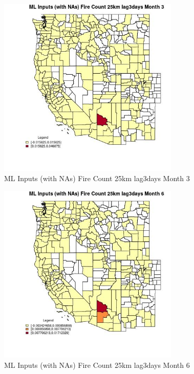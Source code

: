 \begin{figure} 
\centering  
\includegraphics[width=0.77\textwidth]{Code_Outputs/Report_ML_input_PM25_Step4_part_e_de_duplicated_aves_compiled_2019-05-21wNAs_CountyFire_Count_25km_lag3daysmedianMonth3.jpg} 
\caption{\label{fig:Report_ML_input_PM25_Step4_part_e_de_duplicated_aves_compiled_2019-05-21wNAsCountyFire_Count_25km_lag3daysmedianMonth3}ML Inputs (with NAs) Fire Count 25km lag3days Month 3} 
\end{figure} 
 

\begin{figure} 
\centering  
\includegraphics[width=0.77\textwidth]{Code_Outputs/Report_ML_input_PM25_Step4_part_e_de_duplicated_aves_compiled_2019-05-21wNAs_CountyFire_Count_25km_lag3daysmedianMonth6.jpg} 
\caption{\label{fig:Report_ML_input_PM25_Step4_part_e_de_duplicated_aves_compiled_2019-05-21wNAsCountyFire_Count_25km_lag3daysmedianMonth6}ML Inputs (with NAs) Fire Count 25km lag3days Month 6} 
\end{figure} 
 

